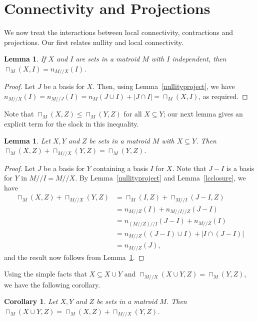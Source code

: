 \documentclass{amsart}
\theoremstyle{plain}
\newtheorem{lemma}[theorem]{Lemma}
\newtheorem{corollary}[theorem]{Corollary}
\theoremstyle{definition}
\newcommand{\dcon}{/ \!\! /}
\renewcommand{\le}{\leqslant}
\renewcommand{\ss}{\subseteq}
\begin{document}
\section{Connectivity and Projections}

We now treat the interactions between local connectivity, contractions and projections.
Our first relates nullity and local connectivity. 

\begin{lemma}\label{lcindep}
  If $X$ and $I$ are sets in a matroid $M$ with $I$ independent, then $\sqcap_M(X, I) = n_{M \dcon X}(I)$. 
\end{lemma}
\begin{proof}
  Let $J$ be a basis for $X$. Then, using Lemma~\ref{nullityproject}, we have
  $n_{M \dcon X}(I) = n_{M \dcon J}(I) = n_M(J \cup I) + |J \cap I| = \sqcap_{M}(X, I)$, as required. 
\end{proof}

Note that $\sqcap_M(X,Z) \le \sqcap_M(Y,Z)$ for all $X \ss Y$; 
our next lemma gives an explicit term for the slack in this inequality.
\begin{lemma}\label{lcpairslack}
  Let $X, Y$ and $Z$ be sets in a matroid $M$ with $X \ss Y$. Then
  $\sqcap_M(X,Z) + \sqcap_{M \dcon X}(Y, Z) = \sqcap_M(Y,Z)$. 
\end{lemma}
\begin{proof}
  Let $J$ be a basis for $Y$ containing a basis $I$ for $X$. Note that $J - I$ is a basis for $Y$ in $M \dcon I = M \dcon X$. 
  By Lemma~\ref{nullityproject} and Lemma~\ref{lcclosure}, we have
  \begin{align*}
    \sqcap_M(X,Z) + \sqcap_{M \dcon X}(Y, Z) 
    &= \sqcap_M(I, Z) + \sqcap_{M \dcon I}(J - I, Z) \\ 
    &= n_{M \dcon Z}(I) + n_{M \dcon I \dcon Z}(J - I) \\
    &= n_{(M \dcon Z) \dcon I}(J - I) + n_{M \dcon Z}(I) \\
    &= n_{M \dcon Z}((J - I) \cup I) + |I \cap (J - I)| \\
    &= n_{M \dcon Z}(J),
  \end{align*}
  and the result now follows from Lemma~\ref{lcindep}.   
\end{proof}

Using the simple facts that $X \ss X \cup Y$ and $\sqcap_{M \dcon X}(X \cup Y, Z) = \sqcap_{M}(Y, Z)$,
we have the following corollary. 
\begin{corollary}\label{lcunionslack}
  Let $X,Y$ and $Z$ be sets in a matroid $M$. Then $\sqcap_M(X \cup Y, Z) = \sqcap_M(X, Z) + \sqcap_{M \dcon X}(Y,Z)$. 
\end{corollary}
\end{document}

